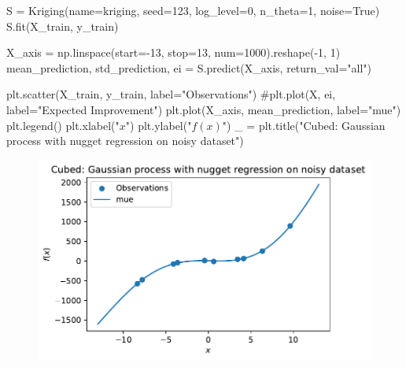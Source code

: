 \documentclass[
  letterpaper,
  DIV=11,
  numbers=noendperiod]{scrreprt}
\newenvironment{Shaded}{\begin{snugshade}}{\end{snugshade}}
\newcommand{\CommentTok}[1]{\textcolor[rgb]{0.37,0.37,0.37}{#1}}
\newcommand{\DecValTok}[1]{\textcolor[rgb]{0.68,0.00,0.00}{#1}}
\newcommand{\NormalTok}[1]{\textcolor[rgb]{0.00,0.23,0.31}{#1}}
\newcommand{\OperatorTok}[1]{\textcolor[rgb]{0.37,0.37,0.37}{#1}}
\newcommand{\StringTok}[1]{\textcolor[rgb]{0.13,0.47,0.30}{#1}}
\newcommand{\VariableTok}[1]{\textcolor[rgb]{0.07,0.07,0.07}{#1}}
\begin{document}
\begin{Shaded}
\begin{Highlighting}[]
\NormalTok{S }\OperatorTok{=}\NormalTok{ Kriging(name}\OperatorTok{=}\StringTok{\textquotesingle{}kriging\textquotesingle{}}\NormalTok{,  seed}\OperatorTok{=}\DecValTok{123}\NormalTok{, log\_level}\OperatorTok{=}\DecValTok{0}\NormalTok{, n\_theta}\OperatorTok{=}\DecValTok{1}\NormalTok{, noise}\OperatorTok{=}\VariableTok{True}\NormalTok{)}
\NormalTok{S.fit(X\_train, y\_train)}

\NormalTok{X\_axis }\OperatorTok{=}\NormalTok{ np.linspace(start}\OperatorTok{={-}}\DecValTok{13}\NormalTok{, stop}\OperatorTok{=}\DecValTok{13}\NormalTok{, num}\OperatorTok{=}\DecValTok{1000}\NormalTok{).reshape(}\OperatorTok{{-}}\DecValTok{1}\NormalTok{, }\DecValTok{1}\NormalTok{)}
\NormalTok{mean\_prediction, std\_prediction, ei }\OperatorTok{=}\NormalTok{ S.predict(X\_axis, return\_val}\OperatorTok{=}\StringTok{"all"}\NormalTok{)}

\NormalTok{plt.scatter(X\_train, y\_train, label}\OperatorTok{=}\StringTok{"Observations"}\NormalTok{)}
\CommentTok{\#plt.plot(X, ei, label="Expected Improvement")}
\NormalTok{plt.plot(X\_axis, mean\_prediction, label}\OperatorTok{=}\StringTok{"mue"}\NormalTok{)}
\NormalTok{plt.legend()}
\NormalTok{plt.xlabel(}\StringTok{"$x$"}\NormalTok{)}
\NormalTok{plt.ylabel(}\StringTok{"$f(x)$"}\NormalTok{)}
\NormalTok{\_ }\OperatorTok{=}\NormalTok{ plt.title(}\StringTok{"Cubed: Gaussian process with nugget regression on noisy dataset"}\NormalTok{)}
\end{Highlighting}
\end{Shaded}

\begin{figure}[H]

{\centering \includegraphics{07_spot_ei_files/figure-pdf/cell-55-output-1.pdf}

}

\end{figure}
\end{document}
